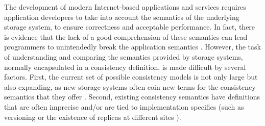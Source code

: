 \documentclass[acmlarge, ,11pt]{acmart}
\begin{document}
   The development of modern Internet-based applications and services requires application developers to take into account the semantics of the
underlying storage system, to ensure correctness and acceptable performance.
In fact, there is evidence that the lack of a good comprehension of these
semantics can lead programmers to unintendedly break the application semantics \cite{Bailis:2015:FCC:2723372.2737784}.
However, the task of understanding and comparing the semantics provided by storage systems, normally encapsulated in a consistency definition, is made difficult by several factors. First, the current set of possible consistency models is not only large but also expanding, as new storage systems often coin new terms for the consistency semantics that they offer \cite{Cooper:2008:PYH:1454159.1454167, Lloyd:2011:DSE:2043556.2043593, Lakshman:2010:CDS:1773912.1773922}.
Second, existing consistency semantics have definitions that are often imprecise and/or are tied to implementation specifics (such as versioning \cite{DBLP:conf/icde/AdyaLO00} or the existence of replicas at different sites \cite{Li:2012:MGS:2387880.2387906}).
\end{document}
